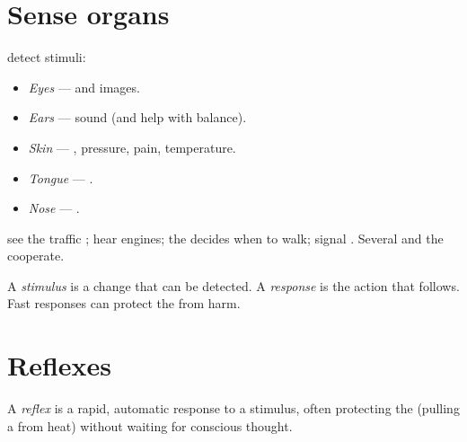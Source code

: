 \section{Sense organs}

\begin{definition}[Senses]\label{def:g5:nerves:senses}
  detect stimuli:
\begin{itemize}
  \item \emph{Eyes} ---  and images.
  \item \emph{Ears} --- sound (and help with balance).
  \item \emph{Skin} --- , pressure, pain, temperature.
  \item \emph{Tongue} --- .
  \item \emph{Nose} --- .
\end{itemize}
\end{definition}

\begin{example}\label{ex:g5:nerves:road}
 see the traffic ;  hear engines; the  decides when
to walk;  signal  . Several  and the  cooperate.
\end{example}

\begin{proposition}\label{prop:g5:nerves:sr}
A \emph{stimulus} is a change that can be detected. A
\emph{response} is the action that follows. Fast
responses can protect the  from harm.
\end{proposition}
\admitted

\section{Reflexes}

\begin{definition}[Reflex]\label{def:g5:nerves:reflex}
A \emph{reflex} is a rapid, automatic response to a
stimulus, often protecting the  (pulling a  from heat) without
waiting for conscious thought.
\end{definition}

